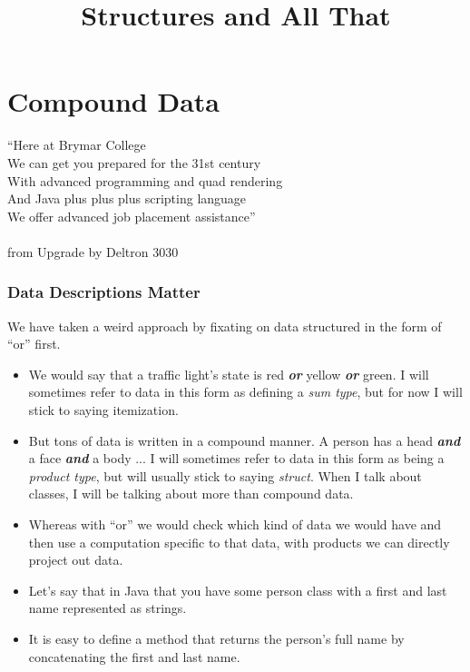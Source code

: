 \documentclass{beamer}
\title{Structures and All That}
\begin{document}
\begin{frame}
\titlepage
\end{frame}
\section{Compound Data}

\begin{frame}
``Here at Brymar College\\
We can get you prepared for the 31st century\\
With advanced programming and quad rendering\\
And Java plus plus plus scripting language\\
We offer advanced job placement assistance''\\\\
from Upgrade by Deltron 3030  
\end{frame}

\begin{frame}
  \frametitle{Data Descriptions Matter}
  We have taken a weird approach by fixating on data structured in the form of ``or'' first.
  \begin{itemize}
  \item<2-> We would say that a traffic light's state is red \textbf{\emph{or}} yellow \textbf{\emph{or}} green. I will sometimes refer to data
    in this form as defining a \emph{sum type}, but for now I will stick to saying itemization.
  \item<3-> But tons of data is written in a compound manner. A person has a head \textbf{\emph{and}} a face \textbf{\emph{and}} a body ...
    I will sometimes refer to data in this form as being a \emph{product type}, but will usually stick to saying \emph{struct}.
    When I talk about classes, I will be talking about more than compound data.
  \item<4-> Whereas with ``or'' we would check which kind of data we would have and then use a computation specific to that data, with
    products we can directly project out data.
  \item<5-> Let's say that in Java that you have some person class with a first and last name represented as strings.
  \item<6-> It is easy to define a method that returns the person's full name by concatenating the first and last name.
  \end{itemize}
\end{frame}
\end{document}
